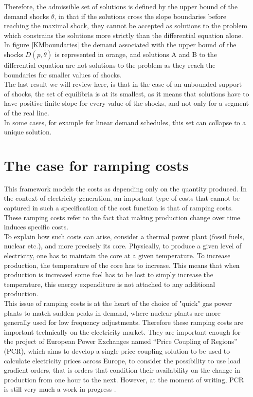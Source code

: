 Therefore, the admissible set of solutions is defined by the upper bound of the demand shocks $\overline{\theta}$, in that if the solutions cross the slope boundaries before reaching the maximal shock, they cannot be accepted as solutions to the problem which constrains the solutions more strictly than the differential equation alone. In figure \ref{KMboundaries} the demand associated with the upper bound of the shocks $D(p,\overline{\theta})$ is represented in orange, and solutions A and B to the differential equation are not solutions to the problem as they reach the boundaries for smaller values of shocks.\\

The last result we will review here, is that in the case of an unbounded support of shocks, the set of equilibria is at its smallest, as it means that solutions have to have positive finite slope for every value of the shocks, and not only for a segment of the real line. \\

In some cases, for example for linear demand schedules, this set can collapse to a unique solution. \\

\section*{The case for ramping costs}

This framework models the costs as depending only on the quantity produced. In the context of electricity generation, an important type of costs that cannot be captured in such a specification of the cost function is that of ramping costs. These ramping costs refer to the fact that making production change over time induces specific costs.\\

To explain how such costs can arise, consider a thermal power plant (fossil fuels, nuclear etc.), and more precisely its core. Physically, to produce a given level of electricity, one has to maintain the core at a given temperature. To increase production, the temperature of the core has to increase. This means that when production is increased some fuel has to be lost to simply increase the temperature, this energy expenditure is not attached to any additional production.\\

This issue of ramping costs is at the heart of the choice of "quick" gas power plants to match sudden peaks in demand, where nuclear plants are more generally used for low frequency adjustments. Therefore these ramping costs are important technically on the electricity market. They are important enough for the project of European Power Exchanges named ``Price Coupling of Regions'' (PCR), which aims to develop a single price coupling solution to be used to calculate electricity prices across Europe, to consider the possibility to use load gradient orders, that is orders that condition their availability on the change in production from one hour to the next. However, at the moment of writing, PCR is still very much a work in progress \cite{EPEXPCR}.\\

